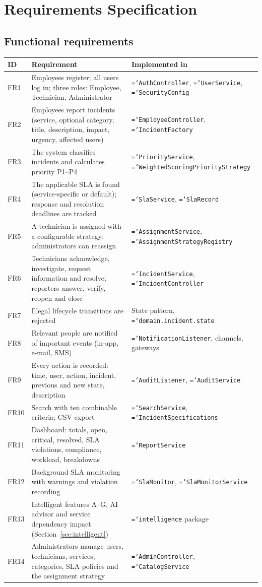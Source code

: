 \documentclass[11pt,a4paper]{article}
\newcommand{\code}[1]{\texttt{\hyphenchar\font=`\-\relax #1}}
\begin{document}
\section{Requirements Specification}

\subsection{Functional requirements}
\begin{longtable}{@{}L{1.1cm}L{8.6cm}L{5.4cm}@{}}
\toprule
\textbf{ID} & \textbf{Requirement} & \textbf{Implemented in} \\
\midrule\endhead
FR1 & Employees register; all users log in; three roles: Employee, Technician, Administrator & \code{AuthController}, \code{UserService}, \code{SecurityConfig} \\
FR2 & Employees report incidents (service, optional category, title, description, impact, urgency, affected users) & \code{EmployeeController}, \code{IncidentFactory} \\
FR3 & The system classifies incidents and calculates priority P1--P4 & \code{PriorityService}, \code{WeightedScoring\-PriorityStrategy} \\
FR4 & The applicable SLA is found (service-specific or default); response and resolution deadlines are tracked & \code{SlaService}, \code{SlaRecord} \\
FR5 & A technician is assigned with a configurable strategy; administrators can reassign & \code{AssignmentService}, \code{AssignmentStrategy\-Registry} \\
FR6 & Technicians acknowledge, investigate, request information and resolve; reporters answer, verify, reopen and close & \code{IncidentService}, \code{IncidentController} \\
FR7 & Illegal lifecycle transitions are rejected & State pattern, \code{domain.incident.state} \\
FR8 & Relevant people are notified of important events (in-app, e-mail, SMS) & \code{NotificationListener}, channels, gateways \\
FR9 & Every action is recorded: time, user, action, incident, previous and new state, description & \code{AuditListener}, \code{AuditService} \\
FR10 & Search with ten combinable criteria; CSV export & \code{SearchService}, \code{IncidentSpecifications} \\
FR11 & Dashboard: totals, open, critical, resolved, SLA violations, compliance, workload, breakdowns & \code{ReportService} \\
FR12 & Background SLA monitoring with warnings and violation recording & \code{SlaMonitor}, \code{SlaMonitorService} \\
FR13 & Intelligent features A--G, AI advisor and service dependency impact (Section~\ref{sec:intelligent}) & \code{intelligence} package \\
FR14 & Administrators manage users, technicians, services, categories, SLA policies and the assignment strategy & \code{AdminController}, \code{CatalogService} \\
\bottomrule
\end{longtable}
\end{document}
